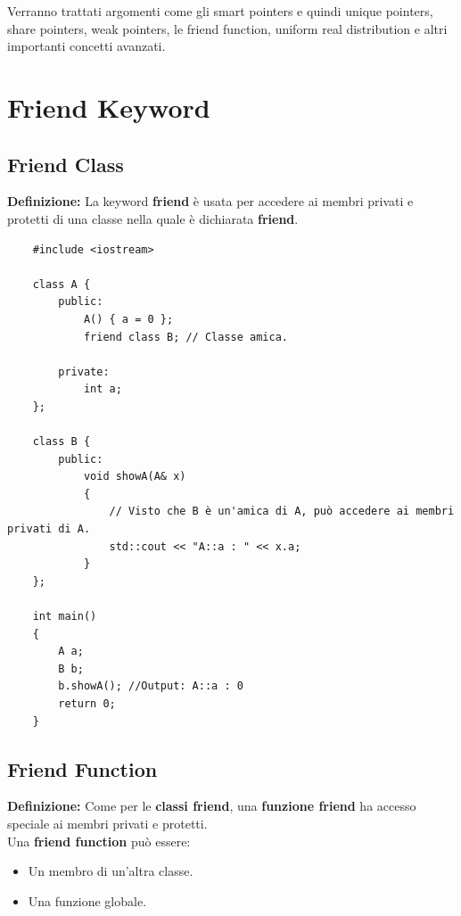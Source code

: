\textsf{\small Verranno trattati argomenti come gli smart pointers e quindi unique pointers, share pointers, weak pointers, le friend function, uniform real distribution e altri importanti concetti avanzati.} \\


\newpage

\section{Friend Keyword}

\subsection{Friend Class}

\textsf{\small \textbf{Definizione: } La keyword \textbf{friend} è usata per accedere ai membri privati e protetti di una classe nella quale è dichiarata \textbf{friend}.} \\

\begin{lstlisting}
	#include <iostream>
	
	class A {
		public:
			A() { a = 0 };
			friend class B; // Classe amica.
			
		private:
			int a;
	};

	class B {
		public:
			void showA(A& x)
			{
				// Visto che B è un'amica di A, può accedere ai membri privati di A.
				std::cout << "A::a : " << x.a; 
			}
	};

	int main()
	{
		A a;
		B b;
		b.showA(); //Output: A::a : 0
		return 0;
	}
\end{lstlisting}

\subsection{Friend Function}

\textsf{\small \textbf{Definizione: } Come per le \textbf{classi friend}, una \textbf{funzione friend} ha accesso speciale ai membri privati e protetti.} \\

\textsf{\small Una \textbf{friend function} può essere: } \\

\begin{itemize}
	\item \textsf{\small Un membro di un'altra classe.}
	\item \textsf{\small Una funzione globale.}
\end{itemize}

